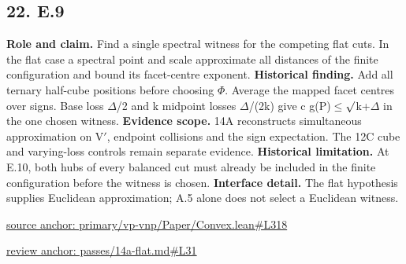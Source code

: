 \documentclass[11pt,letterpaper]{article}
\theoremstyle{definition}\newtheorem{definition}[theorem]{Definition}\newtheorem{example}[theorem]{Example}
\theoremstyle{remark}\newtheorem{remark}[theorem]{Remark}
\begin{document}
\subsection*{22. E.9}
\textbf{Role and claim.} Find a single spectral witness for the competing flat cuts. In the flat case a spectral point and scale approximate all distances of the finite configuration and bound its facet-centre exponent.
\textbf{Historical finding.} Add all ternary half-cube positions before choosing \ensuremath{\Phi}. Average the mapped facet centres over signs. Base loss \ensuremath{\Delta}/2 and k midpoint losses \ensuremath{\Delta}/(2k) give c g(P)\ensuremath{\le}\ensuremath{\sqrt{\vphantom{x}}}k+\ensuremath{\Delta} in the one chosen witness.
\textbf{Evidence scope.} 14A reconstructs simultaneous approximation on V\ensuremath{\prime}, endpoint collisions and the sign expectation. The 12C cube and varying-loss controls remain separate evidence.
\textbf{Historical limitation.} At E.10, both hubs of every balanced cut must already be included in the finite configuration before the witness is chosen.
\textbf{Interface detail.} The flat hypothesis supplies Euclidean approximation; A.5 alone does not select a Euclidean witness.
\par\href{https://github.com/nousentllc/VP-VNP-Review/blob/8a7976933b6b2b4ffda1ad3a0dfb5fc6b6f023e8/primary/vp-vnp/Paper/Convex.lean\#L318}{source anchor: primary/vp-vnp/Paper/Convex.lean\#L318}
\par\href{https://github.com/nousentllc/VP-VNP-Review/blob/8a7976933b6b2b4ffda1ad3a0dfb5fc6b6f023e8/passes/14a-flat.md\#L31}{review anchor: passes/14a-flat.md\#L31}
\goodbreak
{}
\hypertarget{claim.23}{}
\end{document}
